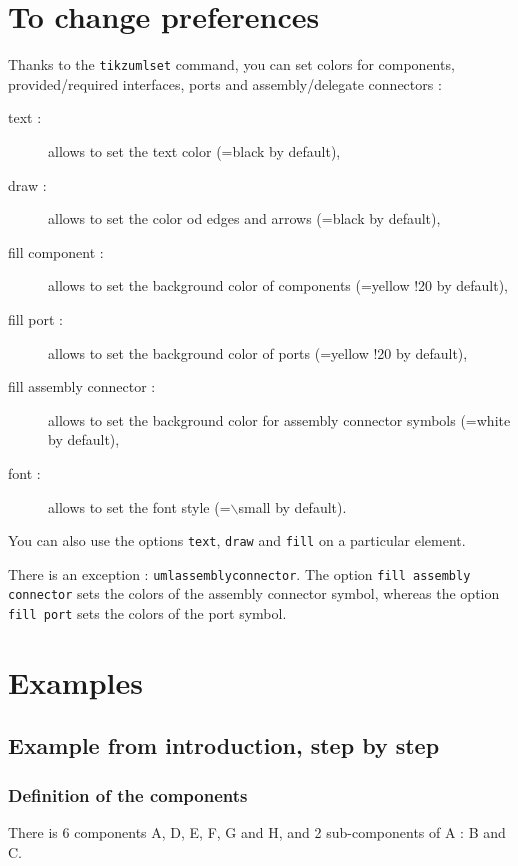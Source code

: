 \documentclass[a4paper,11pt]{report}
\begin{document}
\section{To change preferences}

Thanks to the {\tt tikzumlset} command, you can set colors for components, provided/required interfaces, ports and assembly/delegate connectors :

\begin{description}
\item[text :] allows to set the text color (=black by default),
\item[draw :] allows to set the color od edges and arrows (=black by default),
\item[fill component :] allows to set the background color of components (=yellow !20 by default),
\item[fill port :] allows to set the background color of ports (=yellow !20 by default),
\item[fill assembly connector :] allows to set the background color for assembly connector symbols (=white by default),
\item[font :] allows to set the font style (=$\backslash$small by default).
\end{description}

You can also use the options {\tt text}, {\tt draw} and {\tt fill} on a particular element.

There is an exception : {\tt umlassemblyconnector}. The option {\tt fill assembly connector} sets the colors of the assembly connector symbol, whereas the option {\tt fill port} sets the colors of the port symbol.

\section{Examples}

\subsection{Example from introduction, step by step}

\subsubsection{Definition of the components}

There is 6 components A, D, E, F, G and H, and 2 sub-components of A : B and C.

\medskip
\end{document}
